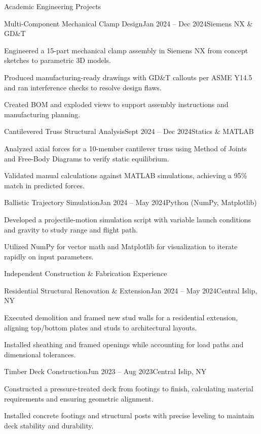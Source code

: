 \documentclass{resume}
\begin{document}
\begin{rSection}{Academic Engineering Projects}
  \begin{rSubsection}{Multi-Component Mechanical Clamp Design}{Jan 2024 -- Dec 2024}{Siemens NX \& GD\&T}{}
    \item Engineered a 15-part mechanical clamp assembly in Siemens NX from concept sketches to parametric 3D models.
    \item Produced manufacturing-ready drawings with GD\&T callouts per ASME Y14.5 and ran interference checks to resolve design flaws.
    \item Created BOM and exploded views to support assembly instructions and manufacturing planning.
  \end{rSubsection}
  \begin{rSubsection}{Cantilevered Truss Structural Analysis}{Sept 2024 -- Dec 2024}{Statics \& MATLAB}{}
    \item Analyzed axial forces for a 10-member cantilever truss using Method of Joints and Free-Body Diagrams to verify static equilibrium.
    \item Validated manual calculations against MATLAB simulations, achieving a 95\% match in predicted forces.
  \end{rSubsection}
  \begin{rSubsection}{Ballistic Trajectory Simulation}{Jan 2024 -- May 2024}{Python (NumPy, Matplotlib)}{}
    \item Developed a projectile-motion simulation script with variable launch conditions and gravity to study range and flight path.
    \item Utilized NumPy for vector math and Matplotlib for visualization to iterate rapidly on input parameters.
  \end{rSubsection}
\end{rSection}

\begin{rSection}{Independent Construction \& Fabrication Experience}
  \begin{rSubsection}{Residential Structural Renovation \& Extension}{Jan 2024 -- May 2024}{Central Islip, NY}{}
    \item Executed demolition and framed new stud walls for a residential extension, aligning top/bottom plates and studs to architectural layouts.
    \item Installed sheathing and framed openings while accounting for load paths and dimensional tolerances.
  \end{rSubsection}
  \begin{rSubsection}{Timber Deck Construction}{Jun 2023 -- Aug 2023}{Central Islip, NY}{}
    \item Constructed a pressure-treated deck from footings to finish, calculating material requirements and ensuring geometric alignment.
    \item Installed concrete footings and structural posts with precise leveling to maintain deck stability and durability.
  \end{rSubsection}
\end{rSection}
\end{document}
